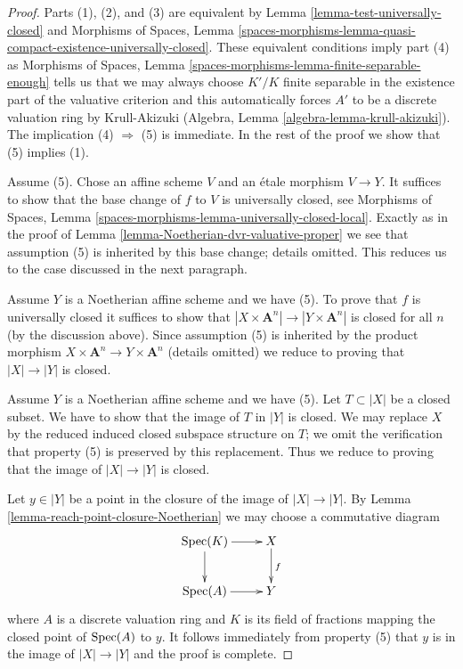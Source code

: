 \begin{proof}
Parts (1), (2), and (3) are equivalent by
Lemma \ref{lemma-test-universally-closed} and
Morphisms of Spaces, Lemma
\ref{spaces-morphisms-lemma-quasi-compact-existence-universally-closed}.
These equivalent conditions imply part (4) as
Morphisms of Spaces, Lemma \ref{spaces-morphisms-lemma-finite-separable-enough}
tells us that we may always choose $K'/K$ finite separable in
the existence part of the valuative criterion and this
automatically forces $A'$ to be a discrete valuation ring by Krull-Akizuki
(Algebra, Lemma \ref{algebra-lemma-krull-akizuki}).
The implication (4) $\Rightarrow$ (5) is immediate.
In the rest of the proof we show that (5) implies (1).

\medskip\noindent
Assume (5). Chose an affine scheme $V$ and an \'etale morphism $V \to Y$.
It suffices to show that the base change of $f$ to $V$ is universally closed,
see Morphisms of Spaces, Lemma
\ref{spaces-morphisms-lemma-universally-closed-local}.
Exactly as in the proof of Lemma \ref{lemma-Noetherian-dvr-valuative-proper}
we see that assumption (5) is inherited by this base change; details
omitted. This reduces us to the case discussed in the next paragraph.

\medskip\noindent
Assume $Y$ is a Noetherian affine scheme and we have (5).
To prove that $f$ is universally closed it suffices to show that
$|X \times \mathbf{A}^n| \to |Y \times \mathbf{A}^n|$ is closed
for all $n$ (by the discussion above). Since assumption (5)
is inherited by the product morphism
$X \times \mathbf{A}^n \to Y \times \mathbf{A}^n$ (details omitted)
we reduce to proving that $|X| \to |Y|$ is closed.

\medskip\noindent
Assume $Y$ is a Noetherian affine scheme and we have (5).
Let $T \subset |X|$ be a closed subset. We have to show that
the image of $T$ in $|Y|$ is closed. We may replace $X$
by the reduced induced closed subspace structure on $T$; we
omit the verification that property (5) is preserved by
this replacement. Thus we reduce to proving that the image
of $|X| \to |Y|$ is closed.

\medskip\noindent
Let $y \in |Y|$ be a point in the closure of the image of
$|X| \to |Y|$. By Lemma \ref{lemma-reach-point-closure-Noetherian}
we may choose a commutative diagram
$$
\xymatrix{
\Spec(K) \ar[r] \ar[d] & X \ar[d]^f \\
\Spec(A) \ar[r] & Y
}
$$
where $A$ is a discrete valuation ring and $K$ is its field of fractions
mapping the closed point of $\mathop{\mathrm{Spec}}(A)$ to $y$. It follows immediately
from property (5) that $y$ is in the image of
$|X| \to |Y|$ and the proof is complete.
\end{proof}


















